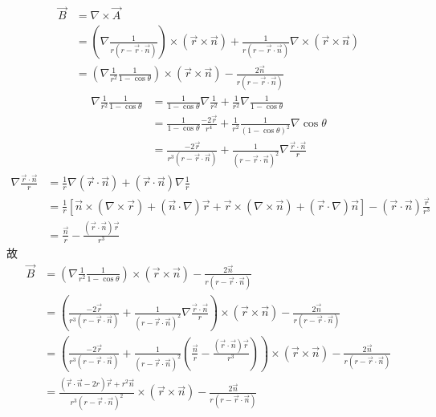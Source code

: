 \documentclass{phyasgn}
\begin{document}
\begin{sol}[4]
  \begin{align*}
    \vec{B}&=\nabla\times\vec{A}\\
    &=(\nabla\frac{1}{r(r-\vec{r}\cdot\vec{n})})\times(\vec{r}\times\vec{n})+\frac{1}{r(r-\vec{r}\cdot\vec{n})}\nabla\times(\vec{r}\times\vec{n})\\
    &=(\nabla\frac{1}{r^2}\frac{1}{1-\cos\theta})\times(\vec{r}\times\vec{n})-\frac{2\vec{n}}{r(r-\vec{r}\cdot\vec{n})}
  \end{align*}
  \begin{align*}
    \nabla\frac{1}{r^2}\frac{1}{1-\cos\theta}&=\frac{1}{1-\cos\theta}\nabla\frac{1}{r^2}+\frac{1}{r^2}\nabla\frac{1}{1-\cos\theta}\\
    &=\frac{1}{1-\cos\theta}\frac{-2\vec{r}}{r^4}+\frac{1}{r^2}\frac{1}{(1-\cos\theta)^2}\nabla\cos\theta\\
    &=\frac{-2\vec{r}}{r^3(r-\vec{r}\cdot\vec{n})}+\frac{1}{(r-\vec{r}\cdot\vec{n})^2}\nabla\frac{\vec{r}\cdot\vec{n}}{r}
  \end{align*}
  \begin{align*}
    \nabla\frac{\vec{r}\cdot\vec{n}}{r}&=\frac{1}{r}\nabla(\vec{r}\cdot\vec{n})+(\vec{r}\cdot\vec{n})\nabla\frac{1}{r}\\
    &=\frac{1}{r}[\vec{n}\times(\nabla\times\vec{r})+(\vec{n}\cdot\nabla)\vec{r}+\vec{r}\times(\nabla\times\vec{n})+(\vec{r}\cdot\nabla)\vec{n}]-(\vec{r}\cdot\vec{n})\frac{\vec{r}}{r^3}\\
    &=\frac{\vec{n}}{r}-\frac{(\vec{r}\cdot\vec{n})\vec{r}}{r^3}
  \end{align*}
  故
  \begin{align*}
    \vec{B}&=(\nabla\frac{1}{r^2}\frac{1}{1-\cos\theta})\times(\vec{r}\times\vec{n})-\frac{2\vec{n}}{r(r-\vec{r}\cdot\vec{n})}\\
    &=(\frac{-2\vec{r}}{r^3(r-\vec{r}\cdot\vec{n})}+\frac{1}{(r-\vec{r}\cdot\vec{n})^2}\nabla\frac{\vec{r}\cdot\vec{n}}{r})\times(\vec{r}\times\vec{n})-\frac{2\vec{n}}{r(r-\vec{r}\cdot\vec{n})}\\
    &=(\frac{-2\vec{r}}{r^3(r-\vec{r}\cdot\vec{n})}+\frac{1}{(r-\vec{r}\cdot\vec{n})^2}(\frac{\vec{n}}{r}-\frac{(\vec{r}\cdot\vec{n})\vec{r}}{r^3}))\times(\vec{r}\times\vec{n})-\frac{2\vec{n}}{r(r-\vec{r}\cdot\vec{n})}\\
    &=\frac{(\vec{r}\cdot\vec{n}-2r)\vec{r}+r^2\vec{n}}{r^3(r-\vec{r}\cdot\vec{n})^2}\times(\vec{r}\times\vec{n})-\frac{2\vec{n}}{r(r-\vec{r}\cdot\vec{n})}
  \end{align*}
\end{sol}\par
\end{document}
